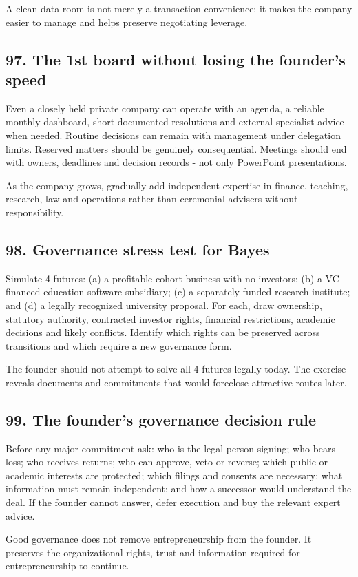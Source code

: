 A clean data room is not merely a transaction convenience; it makes the company easier to manage and helps preserve negotiating leverage.

\subsection{97. The 1st board without losing the founder's speed}

Even a closely held private company can operate with an agenda, a reliable monthly dashboard, short documented resolutions and external specialist advice when needed. Routine decisions can remain with management under delegation limits. Reserved matters should be genuinely consequential. Meetings should end with owners, deadlines and decision records - not only PowerPoint presentations.

As the company grows, gradually add independent expertise in finance, teaching, research, law and operations rather than ceremonial advisers without responsibility.

\subsection{98. Governance stress test for Bayes}

Simulate 4 futures: (a) a profitable cohort business with no investors; (b) a VC-financed education software subsidiary; (c) a separately funded research institute; and (d) a legally recognized university proposal. For each, draw ownership, statutory authority, contracted investor rights, financial restrictions, academic decisions and likely conflicts. Identify which rights can be preserved across transitions and which require a new governance form.

The founder should not attempt to solve all 4 futures legally today. The exercise reveals documents and commitments that would foreclose attractive routes later.

\subsection{99. The founder's governance decision rule}

Before any major commitment ask: who is the legal person signing; who bears loss; who receives returns; who can approve, veto or reverse; which public or academic interests are protected; which filings and consents are necessary; what information must remain independent; and how a successor would understand the deal. If the founder cannot answer, defer execution and buy the relevant expert advice.

Good governance does not remove entrepreneurship from the founder. It preserves the organizational rights, trust and information required for entrepreneurship to continue.

